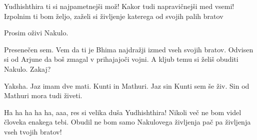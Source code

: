Yudhishthira ti si najpametnejši mož! Kakor tudi napravičnejši med vsemi! Izpolnim ti bom željo, zaželi si življenje katerega od svojih palih bratov 

Prosim oživi Nakulo. 

Presenečen sem. Vem da ti je Bhima najdražji izmed vseh svojih bratov. Odvisen si od Arjune da boš zmagal v prihajajoči vojni. A kljub temu si želiš obuditi Nakulo. Zakaj? 

Yaksha. Jaz imam dve mati. Kunti in Mathuri. Jaz sin Kunti sem še živ. Sin od Mathuri mora tudi živeti. 

Ha ha ha ha ha, aaa, res si velika duša Yudhishthira! Nikoli več ne bom videl človeka enakega tebi. Obudil ne bom samo Nakulovega življenja pač pa življenja vseh tvojih bratov! 

